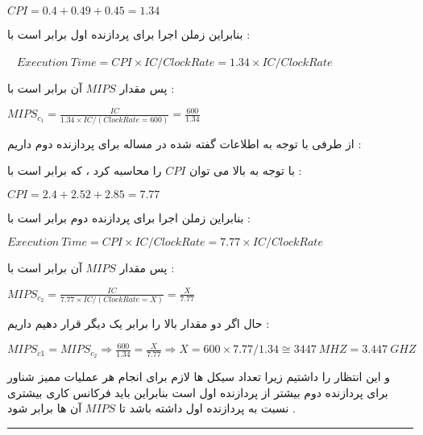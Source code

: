 \documentclass{article}
\begin{document}
\begin{center}
 $ CPI = 0.4 + 0.49 + 0.45 = 1.34$
\end{center}
بنابراین زملن اجرا برای پردازنده اول برابر است با   : 
 \begin{center}
  $ Execution \ Time  = CPI \times IC / Clock Rate =1.34  \times IC  / Clock Rate $
 \end{center}
پس مقدار $MIPS$  آن برابر است با  : 
\begin{center}
	$MIPS_{c_1} = \frac{IC}{1.34  \times IC  / (Clock Rate = 600)} = \frac{600}{1.34} $
\end{center}
از طرفی با توجه به اطلاعات گفته شده در مساله برای پردازنده دوم داریم  : 
\begin{center}
	\begin{table}[h]
		\centering
	\end{table}
\end{center}
با توجه به بالا می توان 
$CPI$
را محاسبه کرد ، که برابر است با   : 

\begin{center}
	$ CPI = 2.4 + 2.52 + 2.85 = 7.77$
\end{center}
بنابراین زملن اجرا برای پردازنده دوم برابر است با   : 
\begin{center}
	$ Execution \ Time  = CPI \times IC /  Clock Rate =7.77  \times IC  / Clock Rate $
\end{center}
پس مقدار $MIPS$  آن برابر است با  : 
\begin{center}
	$MIPS_{c_2} = \frac{IC}{7.77  \times IC  / (Clock Rate = X)} = \frac{X}{7.77} $
\end{center}
حال اگر دو مقدار بالا را برابر یک دیگر قرار دهیم داریم : 
\begin{center}
	$ MIPS_{c1} = MIPS_{c_2} \Rightarrow \frac{600}{1.34} = \frac{X}{7.77} \Rightarrow X = 600 \times 7.77 / 1.34 \cong 3447  \ MHZ = 3.447 \ GHZ$
\end{center}
و این انتظار را داشتیم زیرا تعداد سیکل ها لازم برای انجام هر عملیات ممیز شناور برای پردازنده دوم بیشتر از پردازنده اول است بنابراین باید فرکانس کاری بیشتری نسبت به پردازنده اول داشته باشد تا $MIPS$ آن ها برابر شود . 
\hrule
\end{document}
